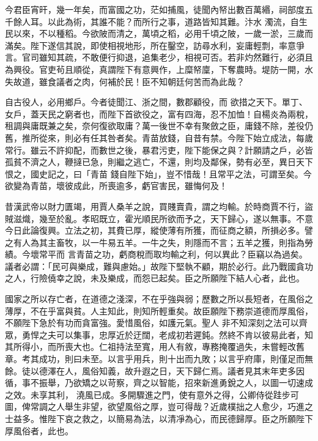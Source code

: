 \begin{pinyinscope}
 今君臣宵旰，幾一年矣，而富國之功，茫如捕風，徒聞內帑出數百萬緡，祠部度五千餘人耳。以此為術，其誰不能？而所行之事，道路皆知其難。汴水
 濁流，自生民以來，不以種稻。今欲陂而清之，萬頃之稻，必用千頃之陂，一歲一淤，三歲而滿矣。陛下遂信其說，即使相視地形，所在鑿空，訪尋水利，妄庸輕剽，率意爭言。官司雖知其疏，不敢便行抑退，追集老少，相視可否。若非灼然難行，必須且為興役。官吏茍且順從，真謂陛下有意興作，上糜帑廩，下奪農時。堤防一開，水失故道，雖食議者之肉，何補於民！臣不知朝廷何苦而為此哉？



 自古役人，必用鄉戶。今者徒聞江、浙之間，數郡顧役，而
 欲措之天下。單丁、女戶，蓋天民之窮者也，而陛下首欲役之，富有四海，忍不加恤！自楊炎為兩稅，租調與庸既兼之矣，奈何復欲取庸？萬一後世不幸有聚斂之臣，庸錢不除，差役仍舊，推所從來，則必有任其咎者矣。青苗放錢，自昔有禁。今陛下始立成法，每歲常行。雖云不許抑配，而數世之後，暴君污吏，陛下能保之與？計願請之戶，必皆孤貧不濟之人，鞭撻已急，則繼之逃亡，不還，則均及鄰保，勢有必至，異日天下恨之，國史記之，曰「青苗
 錢自陛下始」，豈不惜哉！且常平之法，可謂至矣。今欲變為青苗，壞彼成此，所喪逾多，虧官害民，雖悔何及！



 昔漢武帝以財力匱竭，用賈人桑羊之說，買賤賣貴，謂之均輸。於時商賈不行，盜賊滋熾，幾至於亂。孝昭既立，霍光順民所欲而予之，天下歸心，遂以無事。不意今日此論復興。立法之初，其費已厚，縱使薄有所獲，而征商之額，所損必多。譬之有人為其主畜牧，以一牛易五羊。一牛之失，則隱而不言；五羊之獲，則指為勞績。今壞常平而
 言青苗之功，虧商稅而取均輸之利，何以異此？臣竊以為過矣。議者必謂：「民可與樂成，難與慮始。」故陛下堅執不顧，期於必行。此乃戰國貪功之人，行險僥幸之說，未及樂成，而怨已起矣。臣之所願陛下結人心者，此也。



 國家之所以存亡者，在道德之淺深，不在乎強與弱；歷數之所以長短者，在風俗之薄厚，不在乎富與貧。人主知此，則知所輕重矣。故臣願陛下務崇道德而厚風俗，不願陛下急於有功而貪富強。愛惜風俗，如護元氣。聖人
 非不知深刻之法可以齊眾，勇悍之夫可以集事，忠厚近於迂闊，老成初若遲鈍。然終不肯以彼易此者，知其所得小，而所喪大也。仁祖持法至寬，用人有敘，專務掩覆過失，未嘗輕改舊章。考其成功，則曰未至。以言乎用兵，則十出而九敗；以言乎府庫，則僅足而無餘。徒以德澤在人，風俗知義，故升遐之日，天下歸仁焉。議者見其末年吏多因循，事不振舉，乃欲矯之以苛察，齊之以智能，招來新進勇銳之人，以圖一切速成之效。未享其利，
 澆風已成。多開驟進之門，使有意外之得，公卿侍從跬步可圖，俾常調之人舉生非望，欲望風俗之厚，豈可得哉？近歲樸拙之人愈少，巧進之士益多。惟陛下哀之救之，以簡易為法，以清凈為心，而民德歸厚。臣之所願陛下厚風俗者，此也。




\end{pinyinscope}
